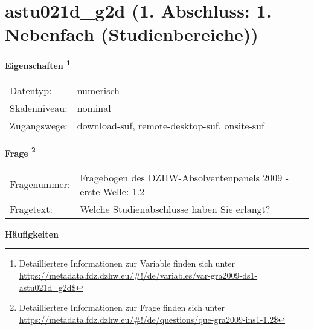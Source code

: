 
    \setcounter{footnote}{0}

    \vspace*{-1.8cm}
	\section{astu021d\_g2d (1. Abschluss: 1. Nebenfach (Studienbereiche))}
	\label{section:astu021d_g2d}



    \vspace*{0.5cm}
    \noindent\textbf{Eigenschaften
	\footnote{Detailliertere Informationen zur Variable finden sich unter
		\url{https://metadata.fdz.dzhw.eu/\#!/de/variables/var-gra2009-ds1-astu021d_g2d$}}}\\
	\begin{tabularx}{\hsize}{@{}lX}
	Datentyp: & numerisch \\
	Skalenniveau: & nominal \\
	Zugangswege: &
	  download-suf, 
	  remote-desktop-suf, 
	  onsite-suf
 \\
    \end{tabularx}



				\vspace*{0.5cm}
                \noindent\textbf{Frage
	                \footnote{Detailliertere Informationen zur Frage finden sich unter
		              \url{https://metadata.fdz.dzhw.eu/\#!/de/questions/que-gra2009-ins1-1.2$}}}\\
				\begin{tabularx}{\hsize}{@{}lX}
					Fragenummer: &
					  Fragebogen des DZHW-Absolventenpanels 2009 - erste Welle:
					  1.2
 \\
					Fragetext: & Welche Studienabschlüsse haben Sie erlangt? \\
				\end{tabularx}





        		\vspace*{0.5cm}
                \noindent\textbf{Häufigkeiten}

